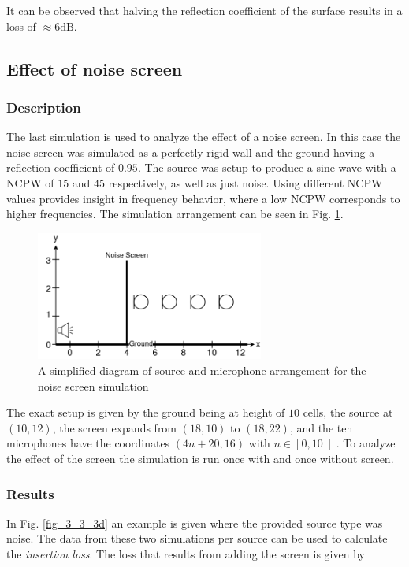 \documentclass[twocolumn]{article}
\begin{document}
It can be observed that halving the reflection coefficient of the surface results in
a loss of $\approx 6\text{dB}$.


\subsection{Effect of noise screen}
\subsubsection{Description}
The last simulation is used to analyze the effect of a noise screen.
In this case the noise screen was simulated as a perfectly rigid wall and
the ground having a reflection coefficient of $0.95$.
The source was setup to produce a sine wave with a NCPW of $15$ and $45$ respectively,
as well as just noise.
Using different NCPW values provides insight in frequency behavior, where a low NCPW
corresponds to higher frequencies.
The simulation arrangement can be seen in Fig. \ref{fig_3_3_example}.

\begin{figure}[H]
    \centering
    \includegraphics[width=75mm]{./Images/tlmfig_3_3.png}
    \caption{A simplified diagram of source and microphone arrangement for the noise screen simulation}
    \label{fig_3_3_example}
\end{figure}

The exact setup is given by the ground being at height of $10$ cells, the source at $\left(10,12\right)$, the
screen expands from $\left(18,10\right)$ to $\left(18,22\right)$, and the ten microphones have the coordinates
$\left(4n+20,16\right)$ with $n\in\left[0,10\right[$.
To analyze the effect of the screen the simulation is run once with and once without screen.

\subsubsection{Results}
In Fig. \ref{fig_3_3_3d} an example is given where the provided source type was noise.
The data from these two simulations per source can be used to calculate the \textit{insertion loss}.
The loss that results from adding the screen is given by
\end{document}
